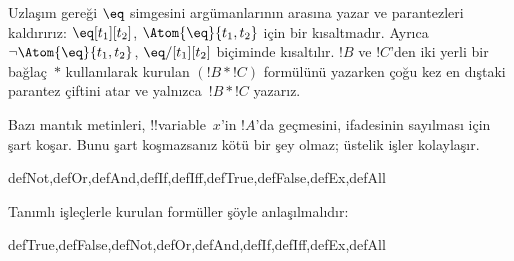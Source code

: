 \documentclass[../../../include/open-logic-section]{subfiles}
\begin{document}
Uzlaşım gereği $\eq$ simgesini argümanlarının arasına yazar ve
parantezleri kaldırırız: $\eq[t_1][t_2]$,
$\Atom{\eq}{t_1,t_2}$ için bir kısaltmadır. Ayrıca
$\lnot \Atom{\eq}{t_1,t_2}$, $\eq/[t_1][t_2]$ biçiminde kısaltılır.
$!B$ ve $!C$'den iki yerli bir bağlaç~$\ast$ kullanılarak kurulan
$(!B \ast !C)$ formülünü yazarken çoğu kez en dıştaki parantez çiftini
atar ve yalnızca~$!B \ast !C$ yazarız.

\begin{intro}
Bazı mantık metinleri, !!{variable}~$x$'in $!A$'da geçmesini,
%
%
%
ifadesinin
sayılması için şart koşar.
Bunu şart koşmazsanız kötü bir şey olmaz; üstelik işler kolaylaşır.
\end{intro}

\begin{tagblock}{defNot,defOr,defAnd,defIf,defIff,defTrue,defFalse,defEx,defAll}
\begin{defn}
Tanımlı işleçlerle kurulan formüller şöyle anlaşılmalıdır:

\begin{tagenumerate}{defTrue,defFalse,defNot,defOr,defAnd,defIf,defIff,defEx,defAll}









\end{tagenumerate}
\end{defn}
\end{tagblock}
\end{document}
